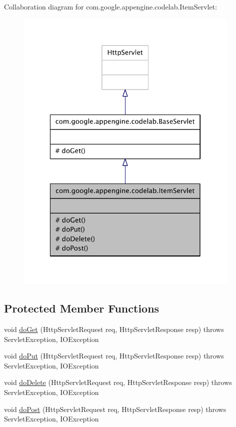 Collaboration diagram for com.\-google.\-appengine.\-codelab.\-Item\-Servlet\-:
\nopagebreak
\begin{figure}[H]
\begin{center}
\leavevmode
\includegraphics[width=304pt]{classcom_1_1google_1_1appengine_1_1codelab_1_1_item_servlet__coll__graph}
\end{center}
\end{figure}
\subsection*{Protected Member Functions}
\begin{DoxyCompactItemize}
\item 
void \hyperlink{classcom_1_1google_1_1appengine_1_1codelab_1_1_item_servlet_ac3bcf595bb8d62c1ef0a44d24ce129c8}{do\-Get} (Http\-Servlet\-Request req, Http\-Servlet\-Response resp)  throws Servlet\-Exception, I\-O\-Exception 
\item 
void \hyperlink{classcom_1_1google_1_1appengine_1_1codelab_1_1_item_servlet_a5d5c9f0b60f447633023ec79cfa95ea1}{do\-Put} (Http\-Servlet\-Request req, Http\-Servlet\-Response resp)  throws Servlet\-Exception, I\-O\-Exception 
\item 
void \hyperlink{classcom_1_1google_1_1appengine_1_1codelab_1_1_item_servlet_a977e84d117d1e9c9faf1be8e71f0e69e}{do\-Delete} (Http\-Servlet\-Request req, Http\-Servlet\-Response resp)  throws Servlet\-Exception, I\-O\-Exception 
\item 
void \hyperlink{classcom_1_1google_1_1appengine_1_1codelab_1_1_item_servlet_a6233275e3c630dbb5ee2e33be6a813ba}{do\-Post} (Http\-Servlet\-Request req, Http\-Servlet\-Response resp)  throws Servlet\-Exception, I\-O\-Exception 
\end{DoxyCompactItemize}


